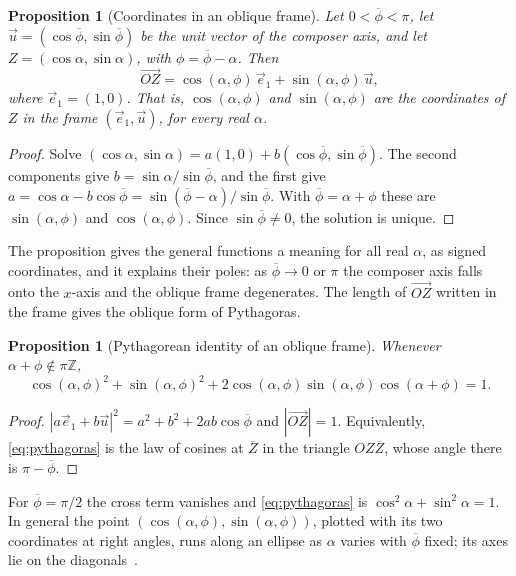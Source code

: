 \documentclass[11pt]{amsart}
\newtheorem{prop}[thm]{Proposition}
\theoremstyle{definition}
\theoremstyle{remark}
\numberwithin{equation}{section}
\newcommand{\pb}{\overline{\phi}}
\begin{document}
\begin{prop}[Coordinates in an oblique frame]
\label{prop:coordinates}
Let $0 < \pb < \pi$, let $\vec u = (\cos\pb, \sin\pb)$ be the unit vector
of the composer axis, and let $Z = (\cos\alpha, \sin\alpha)$, with
$\phi = \pb - \alpha$. Then
\[
\overrightarrow{OZ} = \cos(\alpha,\phi)\,\vec e_1 + \sin(\alpha,\phi)\,\vec u ,
\]
where $\vec e_1 = (1,0)$. That is, $\cos(\alpha,\phi)$ and $\sin(\alpha,\phi)$
are the coordinates of $Z$ in the frame $(\vec e_1, \vec u)$, for every
real $\alpha$.
\end{prop}

\begin{proof}
Solve $(\cos\alpha,\sin\alpha) = a(1,0) + b(\cos\pb,\sin\pb)$. The second
components give $b = \sin\alpha/\sin\pb$, and the first give
$a = \cos\alpha - b\cos\pb = \sin(\pb-\alpha)/\sin\pb$. With
$\pb = \alpha+\phi$ these are $\sin(\alpha,\phi)$ and $\cos(\alpha,\phi)$.
Since $\sin\pb \neq 0$, the solution is unique.
\end{proof}

The proposition gives the general functions a meaning for all real
$\alpha$, as signed coordinates, and it explains their poles: as
$\pb \to 0$ or $\pi$ the composer axis falls onto the $x$-axis and the
oblique frame degenerates. The length of $\overrightarrow{OZ}$ written in
the frame gives the oblique form of Pythagoras.

\begin{prop}[Pythagorean identity of an oblique frame]
\label{prop:pythagoras}
Whenever $\alpha+\phi \notin \pi\mathbb{Z}$,
\begin{equation}
\label{eq:pythagoras}
\cos(\alpha,\phi)^2 + \sin(\alpha,\phi)^2
+ 2\cos(\alpha,\phi)\sin(\alpha,\phi)\cos(\alpha+\phi) = 1 .
\end{equation}
\end{prop}

\begin{proof}
$|a\vec e_1 + b\vec u|^2 = a^2 + b^2 + 2ab\cos\pb$ and $|\overrightarrow{OZ}| = 1$.
Equivalently, \eqref{eq:pythagoras} is the law of cosines at
$\overline{Z}$ in the triangle $OZ\overline{Z}$, whose angle there is
$\pi - \pb$.
\end{proof}

For $\pb = \pi/2$ the cross term vanishes and \eqref{eq:pythagoras} is
$\cos^2\alpha + \sin^2\alpha = 1$. In general the point
$(\cos(\alpha,\phi), \sin(\alpha,\phi))$, plotted with its two
coordinates at right angles, runs along an ellipse as $\alpha$ varies
with $\pb$ fixed; its axes lie on the diagonals~\cite{DerrazGN}.
\end{document}
